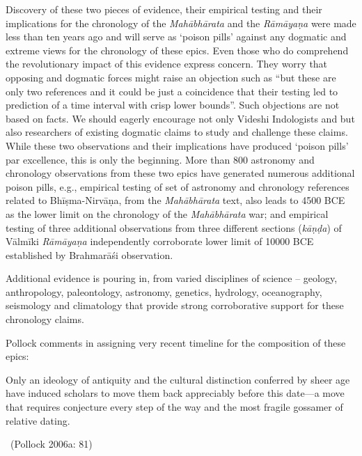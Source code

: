 Discovery of these two pieces of evidence, their empirical testing and their implications for the chronology of the \textit{Mahābhārata} and the \textit{Rāmāyaṇa} were made less than ten years ago and will serve as ‘poison pills’ against any dogmatic and extreme views for the chronology of these epics. Even those who do comprehend the revolutionary impact of this evidence express concern. They worry that opposing and dogmatic forces might raise an objection such as “but these are only two references and it could be just a coincidence that their testing led to prediction of a time interval with crisp lower bounds”. Such objections are not based on facts. We should eagerly encourage not only Videshi Indologists and but also researchers of existing dogmatic claims to study and challenge these claims. While these two observations and their implications have produced ‘poison pills’ par excellence, this is only the beginning. More than 800 astronomy and chronology observations from these two epics have generated numerous additional poison pills, e.g., empirical testing of set of astronomy and chronology references related to Bhīṣma-Nirvāṇa, from the \textit{Mahābhārata} text, also leads to 4500 BCE as the lower limit on the chronology of the \textit{Mahābhārata} war; and empirical testing of three additional observations from three different sections (\textit{kāṇḍa}) of Vālmīki \textit{Rāmāyaṇa} independently corroborate lower limit of 10000 BCE established by Brahmarāśi observation.

Additional evidence is pouring in, from varied disciplines of science – geology, anthropology, paleontology, astronomy, genetics, hydrology, oceanography, seismology and climatology that provide strong corroborative support for these chronology claims.

Pollock comments in assigning very recent timeline for the composition of these epics:

\begin{myquote}
Only an ideology of antiquity and the cultural distinction conferred by sheer age have induced scholars to move them back appreciably before this date—a move that requires conjecture every step of the way and the most fragile gossamer of relative dating. 

~\hfill (Pollock 2006a: 81)
\end{myquote}

